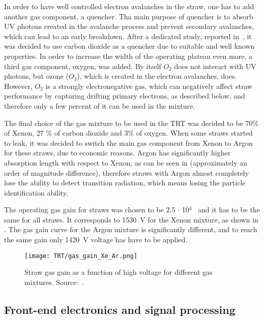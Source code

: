 In order to have well controlled electron avalanches in the straw, one has to add another gas component, a quencher. Tha main purpose of quencher is to absorb UV photons created in the avalanche process and prevent secondary avalanches, which can lead to an early breakdown.
After a dedicated study, reported in~\cite{Abat:2008zza}, it was decided to use carbon dioxide as a quencher due to suitable and well known properties.
In order to increase the width of the operating plateau even more, a third gas component, oxygen, was added.
By itself $O_2$ does not interact with UV photons, but ozone ($O_3$), which is created in the electron avalanches, does.
However, $O_2$ is a strongly electronegative gas, which can negatively affect straw performance by capturing drifting primary electrons, as described below,
and therefore only a few percent of it can be used in the mixture.
 
The final choice of the gas mixture to be used in the TRT was decided to be 70$\%$ of Xenon, 27 $\%$ of carbon dioxide and 3$\%$ of oxygen.
When some straws started to leak, it was decided to switch the main gas component from Xenon to Argon for these straws, due to economic reasons.
Argon has significantly higher absorption length with respect to Xenon, as can be seen in  (approximately an order of magnitude difference), 
therefore straws with Argon almost completely lose the ability to detect transition radiation, 
which means losing the particle identification ability.

The operating gas gain for straws was chosen to be 2.5 $\cdot$ 10$^4$~\cite{ID_TDR_vol1} and it has to be the same for all straws. It corresponds to 1530~V for the Xenon mixture, as shown in .
The gas gain curve for the Argon mixture is significantly different, and to reach the same gain only 1420~V voltage has have to be applied.

\begin{figure}
\centering
\texttt{[image: TRT/gas\_gain\_Xe\_Ar.png]}
\caption{ 
Straw gas gain as a function of high voltage for different gas mixtures. Source:~\cite{Abat:2008zza}.
}
\label{fig:gas_gain}
\end{figure}



\subsection{Front-end electronics and signal processing}
\label{subsubsec:front_end_electronics}

